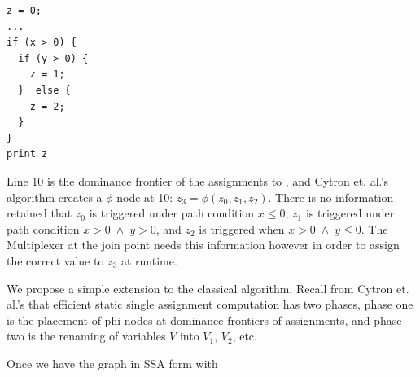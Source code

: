 \documentclass[sigconf, screen, natbib=false, dvipsnames, table]{acmart}
\theoremstyle{definition}
\begin{document}
\begin{verbatim}
z = 0;
...
if (x > 0) {
  if (y > 0) {
    z = 1;
  }  else {
    z = 2;
  }
}
print z
\end{verbatim}
Line 10 is the dominance frontier of the assignments to \z, and Cytron et. al.'s algorithm
creates a $\phi$ node at 10: $z_3 = \phi(z_0, z_1, z_2)$. There is no information retained
that $z_0$ is triggered under path condition $x \le 0$, $z_1$ is triggered under path condition 
$x > 0 \; \wedge \; y > 0$, and $z_2$ is triggered when $x > 0 \; \wedge \; y \le 0$. The 
Multiplexer at the join point needs this information however in order to assign the correct 
value to $z_3$ at runtime.

We propose a simple extension to the classical algorithm. Recall from Cytron et. al.'s 
that efficient static single assignment computation has two phases, phase one is the 
placement of phi-nodes at dominance frontiers of assignments, and phase two is the 
renaming of variables $V$ into $V_1$, $V_2$, etc.



Once we have the graph in SSA form with 
\end{document}
